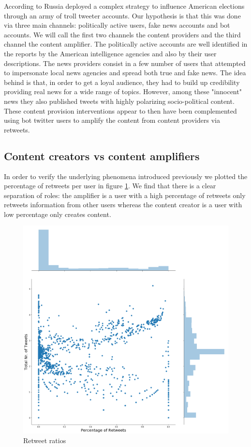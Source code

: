 \documentclass[12pt, authoryear]{elsarticle}
\begin{document}
According to \cite{mueller2019report} Russia deployed a complex strategy to influence American elections through an army of troll tweeter accounts. Our hypothesis is that this was done via three main channels: politically active users, fake news accounts and bot accounts. We will call the first two channels the content providers and the third channel the content amplifier. The politically active accounts are well identified in the reports by the American intelligence agencies and also by their user descriptions. The news providers consist in a few number of users that attempted to impersonate local news agencies and spread both true and fake news. The idea behind is that, in order to get a loyal audience, they had to build up credibility providing real news for a wide range of topics. However, among these "innocent" news they also published tweets with highly polarizing socio-political content. These content provision interventions appear to then have been complemented using bot twitter users to amplify the content from content providers via retweets. 

\subsection{Content creators vs content amplifiers}

In order to verify the underlying phenomena introduced previously we plotted the percentage of retweets per user in figure \ref{retweets:1}. We find that there is a clear separation of roles: the amplifier is a user with a high percentage of retweets only retweets information from other users whereas the content creator is a user with low percentage only creates content.

\begin{figure}[t]
\includegraphics[width=\textwidth]{retweets}
\centering
\caption{Retweet ratios}
\label{retweets:1}
\end{figure}
\end{document}
